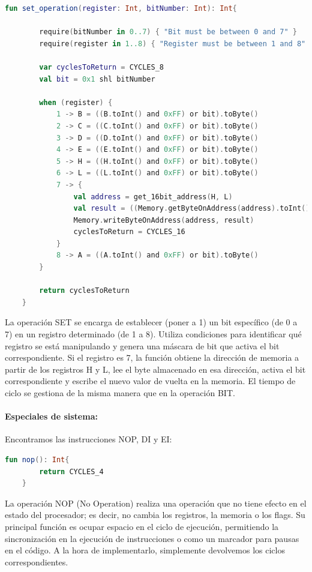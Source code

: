 \begin{lstlisting}[language=Kotlin, caption={Operación SET}, label={code:kotlinset}]
    fun set_operation(register: Int, bitNumber: Int): Int{

        require(bitNumber in 0..7) { "Bit must be between 0 and 7" }
        require(register in 1..8) { "Register must be between 1 and 8" }

        var cyclesToReturn = CYCLES_8
        val bit = 0x1 shl bitNumber

        when (register) {
            1 -> B = ((B.toInt() and 0xFF) or bit).toByte()
            2 -> C = ((C.toInt() and 0xFF) or bit).toByte()
            3 -> D = ((D.toInt() and 0xFF) or bit).toByte()
            4 -> E = ((E.toInt() and 0xFF) or bit).toByte()
            5 -> H = ((H.toInt() and 0xFF) or bit).toByte()
            6 -> L = ((L.toInt() and 0xFF) or bit).toByte()
            7 -> {
                val address = get_16bit_address(H, L)
                val result = ((Memory.getByteOnAddress(address).toInt() and 0xFF) or bit).toByte()
                Memory.writeByteOnAddress(address, result)
                cyclesToReturn = CYCLES_16
            }
            8 -> A = ((A.toInt() and 0xFF) or bit).toByte()
        }

        return cyclesToReturn
    }
\end{lstlisting}

La operación SET se encarga de establecer (poner a 1) un bit específico (de 0 a 7) en un registro determinado (de 1 a 8). Utiliza condiciones para identificar qué registro se está manipulando y genera una máscara de bit que activa el bit correspondiente. Si el registro es 7, la función obtiene la dirección de memoria a partir de los registros H y L, lee el byte almacenado en esa dirección, activa el bit correspondiente y escribe el nuevo valor de vuelta en la memoria. El tiempo de ciclo se gestiona de la misma manera que en la operación BIT.

\paragraph{Especiales de sistema:} Encontramos las instrucciones NOP, DI y EI:

\begin{lstlisting}[language=Kotlin, caption={Operación NOP}, label={code:kotlinnop}]
    fun nop(): Int{
        return CYCLES_4
    }
\end{lstlisting}

La operación NOP (No Operation) realiza una operación que no tiene efecto en el estado del procesador; es decir, no cambia los registros, la memoria o los flags. Su principal función es ocupar espacio en el ciclo de ejecución, permitiendo la sincronización en la ejecución de instrucciones o como un marcador para pausas en el código. A la hora de implementarlo, simplemente devolvemos los ciclos correspondientes.

